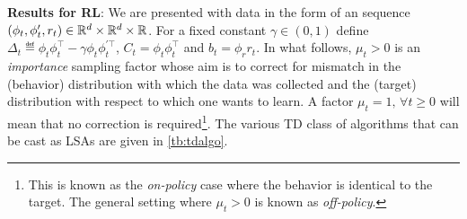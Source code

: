 \textbf{Results for RL}: We are presented with data in the form of an \iid sequence $(\phi_t,\phi'_t,r_t)\in \mathbb{R}^d\times\mathbb{R}^d\times \mathbb{R}$. For a fixed constant $\gamma \in (0,1)$ define  $\Delta_t\eqdef \phi_t\phi_t^\top-\gamma \phi_t\phi_t^{'\top}$, $C_t=\phi_t\phi_t^\top$ and $b_t=\phi_r r_t$. In what follows, $\mu_t>0$ is an \emph{importance} sampling factor whose aim is to correct for mismatch in the (behavior) distribution with which the data was collected and the (target) distribution with respect to which one wants to learn. A factor $\mu_t=1,\,\forall t\geq 0$ will mean that no correction is required\footnote{This is known as the \emph{on-policy} case where the behavior is identical to the target. The general setting where $\mu_t>0$ is known as \emph{off-policy}.}. The various TD class of algorithms that can be cast as LSAs are given in \cref{tb:tdalgo}.
\begin{table}
\caption{Rates for TD algorithms available in the literature \cite{korda-prashanth,gtdmp,gtd2}. }
\label{tb:tdalgo}
\end{table}
